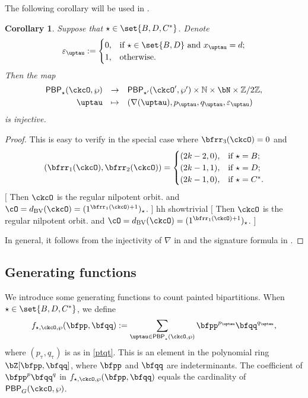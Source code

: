 \documentclass[12pt]{amsart}
\newcommand{\trivial}[2][]{\if\relax\detokenize{#1}\relax
  {%
      \color{orange} \vspace{0em}$[$#2$]$
      \color{black}
  }
  \else
\ifx#1h
\ifcsname showtrivial\endcsname
{%
    \color{orange}\vspace{0em}$[$#2$]$
    \color{black}
}
\fi
\else {\red Wrong argument!} \fi
\fi
}
\def\subset{\subseteq}
\newcommand{\BN}{{\mathbb {N}}}
\newcommand{\CO}{{\mathcal {O}}}
\newcommand{\Z}{\mathbb{Z}}
\def\DD{\nabla}
\numberwithin{equation}{section}
\newtheorem{cor}[thm]{Corollary}
\theoremstyle{remark}
\def\dBV{d_{\mathrm{BV}}}
\def\DD{\nabla}
\def\PBP{\mathsf{PBP}}
\def\PBPop#1#2#3#4{\PBP_{#1}^{#2}(#3,#4)}
\newcommand{\PBPOP}[1][]{\PBPop{\star}{#1}{\ckcO}{\wp}}
\def\PBPOPp{\PBPop{\star'}{}{\ckcO'}{\wp'}}
\def\DD{\nabla}
\begin{document}
The following corollary will be used in \cite{BMSZ2}.
\begin{cor}\label{prop:DD.BDinj}
  Suppose that $\star \in \set{B, D,C^*}$.
 Denote
  \[
    \varepsilon_{\uptau} := \begin{cases}
      0, & \text{if $\star\in \set{B,D}$ and $x_{\uptau}=d$;}\\
      1, & \text{otherwise.}
    \end{cases}
  \]
  Then the map
\begin{equation*}
  \begin{array}{rcl}
   \PBPOP&\rightarrow&
   \PBPOPp \times \BN\times \bN\times \Z/2\Z, \smallskip\\
   \uptau& \mapsto & (\DD(\uptau), p_\uptau, q_\uptau, \varepsilon_\uptau)
   \end{array}
\end{equation*}
is injective.
\end{cor}
\begin{proof}
This is easy to verify in the special  case where $\bfrr_{3}(\ckcO)=0$ and
    \[
      (\bfrr_{1}(\ckcO), \bfrr_{2}(\ckcO))
      =
      \begin{cases}
        (2k-2,0), & \text{if } \star=B;\\
        (2k-1,1), & \text{if } \star=D;\\
        (2k-1,0), & \text{if } \star=C^{*}.\\
      \end{cases}
    \]
    \trivial[h]{
    Then $\ckcO$ is the regular nilpotent orbit.
    and $\cO =\dBV(\ckcO) = (1^{\bfrr_{1}(\ckcO)+1})_{\star}$.
    }
    In general, it follows from the injectivity of $\DD$ in 
    and the signature formula in .
\end{proof}


\subsection{Generating functions}\label{sec: generating}


We introduce some generating functions to count painted bipartitions. %
When $\star \in  \set{B,D, C^{*}}$, we define
\[
   f_{\star,\ckcO,\wp}(\bfpp,\bfqq) := \sum_{\uptau \in \PBPOP} \bfpp^{p_{\uptau}} \bfqq^{q_{\uptau}},
\]
where $(p_{\uptau}, q_{\uptau})$ is as in \eqref{ptqt}.
 This is an element in the polynomial ring $\bZ[\bfpp,\bfqq]$, where $\bfpp$ and $\bfqq$ are indeterminants. The coefficient of $\bfpp^{p}\bfqq^{q}$ in $f_{\star,\ckcO,\wp}(\bfpp,\bfqq)$  equals the cardinality of
 $\PBPop{G}{}{\ckcO}{\wp}$.
\end{document}
